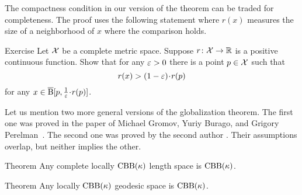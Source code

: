 The compactness condition in our version of the theorem can be traded for completeness.
The proof uses the following statement where $r(x)$ measures the size of a neighborhood of $x$ where the comparison holds.

\begin{thm}{Exercise}\label{ex:alm-min}
Let $\mathcal{X}$ be a complete metric space.
Suppose $r\colon\mathcal{X}\to \mathbb{R}$ is a positive continuous function.
Show that for any $\varepsilon>0$ there is a point $p\in \mathcal{X}$ such that 
\[r(x)> (1-\eps)\cdot r(p)\] 
for any $x\in \cBall[p,\tfrac{1}{\eps}\cdot r(p)]$.

\end{thm}

Let us mention two more general versions of the globalization theorem.
The first one was  proved in the paper of Michael Gromov, Yuriy Burago, and Grigory Perelman~\cite{burago-gromov-perelman}.
The second one was proved by the second author \cite{petrunin:globalization}.
Their assumptions overlap, but neither implies the other.

\begin{thm}{Theorem}
Any complete locally $\mathrm{CBB}(\kappa)$ length space is $\mathrm{CBB}(\kappa)$.

\end{thm}

\begin{thm}{Theorem}\label{ex:noncomplete-globalization}
Any locally $\mathrm{CBB}(\kappa)$ geodesic space is $\mathrm{CBB}(\kappa)$.

\end{thm}




